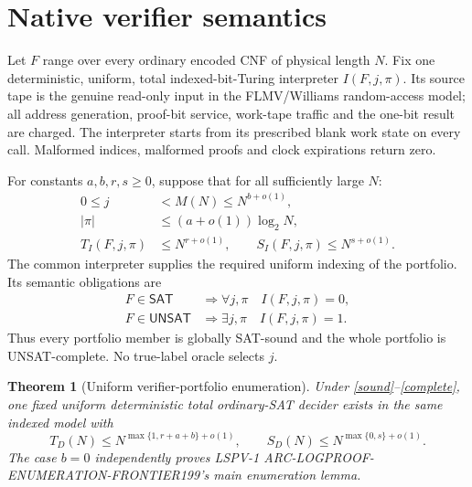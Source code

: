 \documentclass[11pt]{article}
\newtheorem{theorem}{Theorem}
\newcommand{\SAT}{\mathsf{SAT}}
\newcommand{\UNSAT}{\mathsf{UNSAT}}
\begin{document}
\section{Native verifier semantics}

Let $F$ range over every ordinary encoded CNF of physical length $N$.  Fix one deterministic, uniform, total indexed-bit-Turing interpreter $I(F,j,\pi)$.  Its source tape is the genuine read-only input in the FLMV/Williams random-access model; all address generation, proof-bit service, work-tape traffic and the one-bit result are charged.  The interpreter starts from its prescribed blank work state on every call.  Malformed indices, malformed proofs and clock expirations return zero.

For constants $a,b,r,s\ge0$, suppose that for all sufficiently large $N$:
\begin{align*}
  0\le j&<M(N)\le N^{b+o(1)},\\
  |\pi|&\le (a+o(1))\log_2N,\\
  T_I(F,j,\pi)&\le N^{r+o(1)},\qquad
  S_I(F,j,\pi)\le N^{s+o(1)}.
\end{align*}
The common interpreter supplies the required uniform indexing of the portfolio.  Its semantic obligations are
\begin{align}
 F\in\SAT &\Longrightarrow \forall j,\pi\quad I(F,j,\pi)=0, \tag{S}\label{sound}\\
 F\in\UNSAT &\Longrightarrow \exists j,\pi\quad I(F,j,\pi)=1. \tag{C}\label{complete}
\end{align}
Thus every portfolio member is globally SAT-sound and the whole portfolio is UNSAT-complete.  No true-label oracle selects $j$.

\begin{theorem}[Uniform verifier-portfolio enumeration]
Under \eqref{sound}--\eqref{complete}, one fixed uniform deterministic total ordinary-SAT decider exists in the same indexed model with
\[
 T_D(N)\le N^{\max\{1,r+a+b\}+o(1)},\qquad
 S_D(N)\le N^{\max\{0,s\}+o(1)}.
 \tag{1}
\]
The case $b=0$ independently proves LSPV-1 ARC-LOGPROOF-ENUMERATION-FRONTIER199's main enumeration lemma.
\end{theorem}
\end{document}

